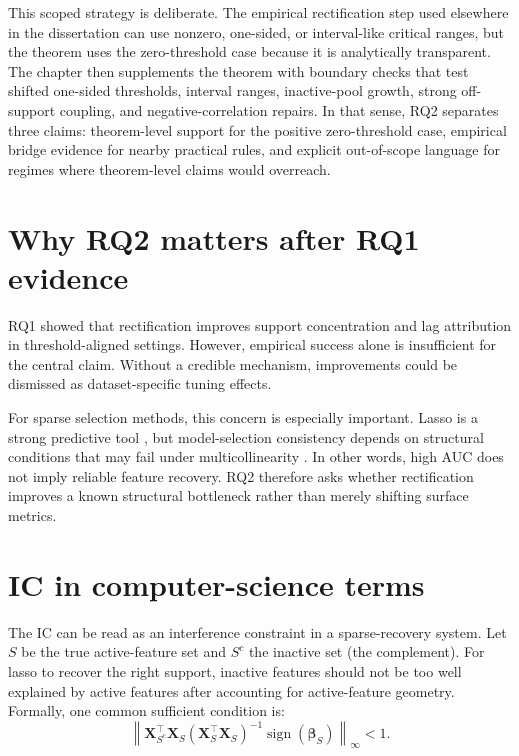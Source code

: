 This scoped strategy is deliberate. The empirical rectification step used elsewhere in the dissertation can use nonzero, one-sided, or interval-like critical ranges, but the theorem uses the zero-threshold case because it is analytically transparent. The chapter then supplements the theorem with boundary checks that test shifted one-sided thresholds, interval ranges, inactive-pool growth, strong off-support coupling, and negative-correlation repairs. In that sense, RQ2 separates three claims: theorem-level support for the positive zero-threshold case, empirical bridge evidence for nearby practical rules, and explicit out-of-scope language for regimes where theorem-level claims would overreach.

\section{Why RQ2 matters after RQ1 evidence}

RQ1 showed that rectification improves support concentration and lag attribution in threshold-aligned settings. However, empirical success alone is insufficient for the central claim. Without a credible mechanism, improvements could be dismissed as dataset-specific tuning effects.

For sparse selection methods, this concern is especially important. Lasso is a strong predictive tool \autocite{tibshirani1996}, but model-selection consistency depends on structural conditions that may fail under multicollinearity \autocite{PZhao2006model}. In other words, high AUC does not imply reliable feature recovery. RQ2 therefore asks whether rectification improves a known structural bottleneck rather than merely shifting surface metrics.

\section{IC in computer-science terms}

The IC can be read as an interference constraint in a sparse-recovery system. Let $S$ be the true active-feature set and $S^c$ the inactive set (the complement). For lasso to recover the right support, inactive features should not be too well explained by active features after accounting for active-feature geometry. Formally, one common sufficient condition is:
\begin{equation}\label{eq:rq2-irrepresentable-condition}
\left\|\mathbf{X}_{S^c}^{\top}\mathbf{X}_S(\mathbf{X}_S^{\top}\mathbf{X}_S)^{-1}\operatorname{sign}(\boldsymbol{\beta}_S)\right\|_\infty < 1.
\end{equation}

